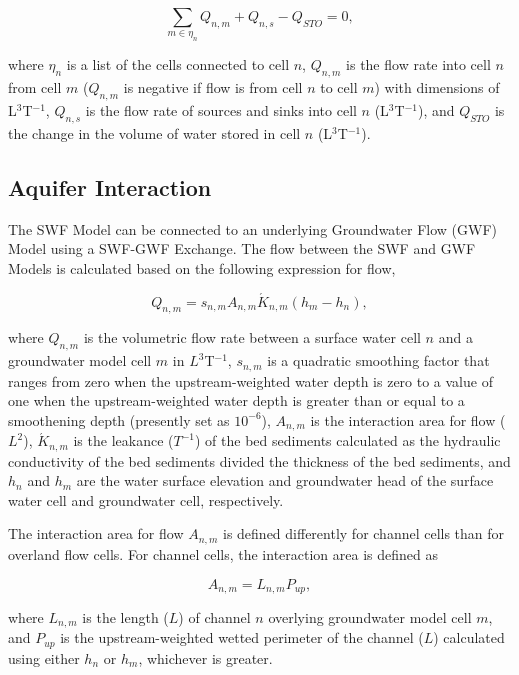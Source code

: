 \documentclass[fleqn]{article}
\begin{document}
\begin{equation}
  \label{eqn:cvfd}
  \sum \limits_{m \in \eta_{n}} Q_{n,m} + Q_{n,s} - Q_{STO} = 0,
\end{equation}
  
\noindent where $\eta_{n}$ is a list of the cells connected to cell $n$, $Q_{n,m}$ is the flow rate into cell $n$ from cell $m$ ($Q_{n,m}$ is negative if flow is from cell $n$ to cell $m$) with dimensions of L$^{3}$T$^{-1}$, $Q_{n,s}$ is the flow rate of sources and sinks into cell $n$ (L$^{3}$T$^{-1}$), and $Q_{STO}$ is the change in the volume of water stored in cell $n$ (L$^{3}$T$^{-1}$).

\subsection{Aquifer Interaction}

The SWF Model can be connected to an underlying Groundwater Flow (GWF) Model using a SWF-GWF Exchange.  The flow between the SWF and GWF Models is calculated based on the following expression for flow,

\begin{equation}
  Q_{n,m} = s_{n,m} A_{n,m} \acute{K}_{n,m} (h_m - h_n),
\end{equation}

\noindent where $Q_{n,m}$ is the volumetric flow rate between a surface water cell $n$ and a groundwater model cell $m$ in $L^{3}$T$^{-1}$, $s_{n,m}$ is a quadratic smoothing factor that ranges from zero when the upstream-weighted water depth is zero to a value of one when the upstream-weighted water depth is greater than or equal to a smoothening depth (presently set as $10^{-6}$), $A_{n,m}$ is the interaction area for flow ($L^2$), $\acute{K}_{n,m}$ is the leakance ($T^{-1}$) of the bed sediments calculated as the hydraulic conductivity of the bed sediments divided the thickness of the bed sediments, and $h_n$ and $h_m$ are the water surface elevation and groundwater head of the surface water cell and groundwater cell, respectively.

The interaction area for flow $A_{n,m}$ is defined differently for channel cells than for overland flow cells.  For channel cells, the interaction area is defined as

\begin{equation}
  A_{n,m} = L_{n,m} P_{up},
\end{equation}

\noindent where $L_{n,m}$ is the length ($L$) of channel $n$ overlying groundwater model cell $m$, and $P_{up}$ is the upstream-weighted wetted perimeter of the channel ($L$) calculated using either $h_n$ or $h_m$, whichever is greater.
\end{document}
